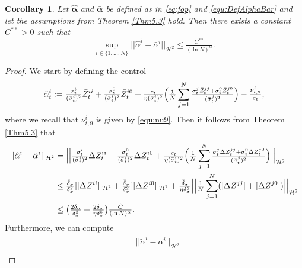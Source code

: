 \documentclass[10pt,a4paper]{article}
\newcommand{\hC}{\hat{C}}
\newcommand{\Balpha}{\boldsymbol{\alpha}}
\theoremstyle{plain}
\newtheorem{Corollary}[Theorem]{Corollary}
\theoremstyle{definition}
\numberwithin{equation}{section}
\begin{document}
\begin{Corollary}
\label{Cor5.4}
Let $\hat{\Balpha}$ and $\bar{\Balpha}$ be defined as in \eqref{eq:fop} and \eqref{equ:DefAlphaBar} and let the assumptions from Theorem \ref{Thm5.3} hold. Then there exists a constant $C^{**}>0 $ 
such that
\[
\sup_{i\in \{1,...,N\}}||\hat{\alpha}^{i}-\bar{\alpha}^{i}||_{\mathcal{H}^{2}} \leq \tfrac{C^{**}}{(\ln{N})^{\alpha}}.
\]
\end{Corollary}
\begin{proof}

We start by defining the control
\begin{equation}
\label{equ:DefAlphaTilde}
\tilde{\alpha}_{t}^{i} := \tfrac{\sigma_{t}^{i}}{(\bar{\sigma}_{t}^{i})^{2}}\bar{Z}_{t}^{ii} + \tfrac{\sigma_{t}^{0}}{(\bar{\sigma}_{t}^{i})^{2}}\bar{Z}_{t}^{i0} + \tfrac{c_{t}}{\eta(\bar{\sigma}_{t}^{i})^{2}}\Bigl(\tfrac{1}{N}\sum_{j=1}^{N}\tfrac{\sigma_{t}^{j}\bar{Z}_{t}^{jj}+\sigma_{t}^{0}\bar{Z}_{t}^{j0}}{(\bar{\sigma}_{t}^{j})^{2}}\Bigr) -\tfrac{\nu_{t,9}^{i}}{c_{t}},
\end{equation}
where we recall that $\nu^i_{t,9}$ is given by \eqref{equ:nu9}. Then it follows from Theorem \ref{Thm5.3} that
\begin{align*}
||\hat{\alpha}^{i}-\tilde{\alpha}^{i}||_{\mathcal{H}^{2}} &= \Bigl|\Bigl|\tfrac{\sigma_{t}^{i}}{(\bar{\sigma}_{t}^{i})^{2}}\Delta{Z}_{t}^{ii} + \tfrac{\sigma_{t}^{0}}{(\bar{\sigma}_{t}^{i})^{2}}\Delta{Z}_{t}^{i0} + \tfrac{c_{t}}{\eta(\bar{\sigma}_{t}^{i})^{2}}\Bigl(\tfrac{1}{N}\sum_{j=1}^{N}\tfrac{\sigma_{t}^{j}\Delta{Z}_{t}^{jj}+\sigma_{t}^{0}\Delta{Z}_{t}^{j0}}{(\bar{\sigma}_{t}^{j})^{2}}\Bigr)\Bigr|\Bigr|_{\mathcal{H}^{2}} \\
&\leq \tfrac{\bar{\delta}_{\sigma}}{\delta_{\sigma}^{2}}||\Delta Z^{ii}||_{\mathcal{H}^{2}} + \tfrac{\bar{\delta}_{\sigma}}{\delta_{\sigma}^{2}}||\Delta Z^{i0}||_{\mathcal{H}^{2}} + \tfrac{\bar{\delta}_{\sigma}}{\eta\delta_{\sigma}^{5}} \Bigl|\Bigl|\tfrac{1}{N}\sum_{j=1}^{N}(|\Delta Z^{jj}|+|\Delta Z^{j0}| )\Bigr|\Bigr|_{\mathcal{H}^{2}} \\
&\leq \bigl(\tfrac{2\bar{\delta}_{\sigma}}{\delta_{\sigma}^{2}}+\tfrac{2\bar{\delta}_{\sigma}}{\eta\delta_{\sigma}^{5}}\bigr)\tfrac{\hC}{(\ln{N})^{\alpha}}.
\end{align*}
Furthermore, we can compute
\begin{align*}
&||\tilde{\alpha}^{i}-\bar{\alpha}^{i}||_{\mathcal{H}^{2}} \\

\end{align*}
\end{proof}
\end{document}
